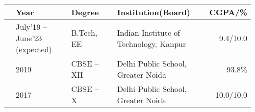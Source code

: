 
\newcommand{\education}[4]{
  & #1 & #2 & &#3 & #4
}
\begin{center}
\begin{tabular}{ | L{0.05cm} l | L{3cm} | L{0.05cm} C{7cm} | r |}
  \hline
  \education{\textbf{Year}}{\textbf{Degree}}{\textbf{Institution(Board)}}{\textbf{CGPA/\%}}\\
  \hline
  \education{July'19 -- June'23 (expected)}{B.Tech, EE}{Indian Institute of Technology, Kanpur}{9.4/10.0}\\
  \education{2019}{CBSE -- XII}{Delhi Public School, Greater Noida}{93.8\%}\\
  \education{2017}{CBSE -- X}{Delhi Public School, Greater Noida}{10.0/10.0}\\
  \hline
\end{tabular}
\end{center}
\vspace{-4mm}

